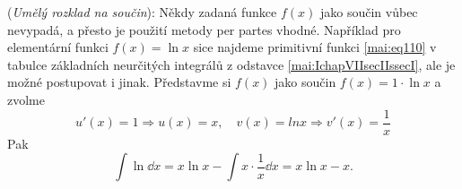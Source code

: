 \begin{mdframed}[style=mdexam]
  \begin{example}\label{mai:exam109}
    (\emph{Umělý rozklad na součin}): Někdy zadaná funkce \(f(x)\) jako součin vůbec nevypadá, a
    přesto je použití metody per partes vhodné. Například pro elementární funkci \(f(x) = \ln x\)
    sice najdeme primitivní funkci \ref{mai:eq110} v tabulce základních neurčitých integrálů z
    odstavce \ref{mai:IchapVIIsecIIssecI}, ale je možné postupovat i jinak. Představme si \(f(x)\) jako
    součin \(f(x) = 1\cdot\ln x\) a zvolme \[u'(x) = 1 ⇒ u(x) = x, \quad v(x) = lnx ⇒ v'(x) =
    \frac{1}{x}\] Pak 
    \begin{equation*}
      \int\ln\dd{x} = x\ln x - \int x\cdot\frac{1}{x}\dd{x}= x\ln x - x.
    \end{equation*}
  \end{example}
\end{mdframed}